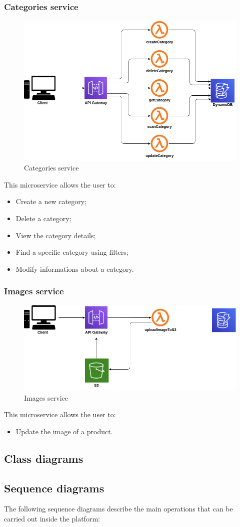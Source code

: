 \subsubsection{Categories service}
\begin{figure}[!h]
    \vspace{5px}
    \includegraphics[scale=0.5]{../../../../Images/Diagrammi/maintainerManual/categoriesService.png}
    \centering
    \caption{Categories service}
\end{figure}
This microservice allows the user to:
\begin{itemize}
    \item Create a new category;
    \item Delete a category;
    \item View the category details;
    \item Find a specific category using filters;
    \item Modify informations about a category.
\end{itemize}
\pagebreak
\subsubsection{Images service}
\begin{figure}[!h]
    \vspace{5px}
    \includegraphics[scale=0.5]{../../../../Images/Diagrammi/maintainerManual/imageService.png}
    \centering
    \caption{Images service}
\end{figure}
This microservice allows the user to:
\begin{itemize}
    \item Update the image of a product.
\end{itemize}

\subsection{Class diagrams}
\subsection{Sequence diagrams}
The following sequence diagrams describe the main operations that can be carried out inside the platform: